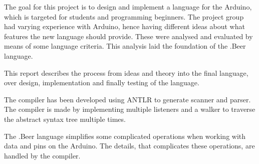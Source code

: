 The goal for this project is to design and implement a language for the Arduino, which is targeted for students and programming beginners. %
The project group had varying experience with Arduino, hence having different ideas about what features the new language should provide. These were analysed and evaluated by means of some language criteria. This analysis laid the foundation of the .Beer language.%

This report describes the process from ideas and theory into the final language, over design, implementation and finally testing of the language.

The compiler has been developed using ANTLR to generate scanner and parser. The compiler is made by implementing multiple listeners and a walker to traverse the abstract syntax tree multiple times.

The .Beer language simplifies some complicated operations when working with data and pins on the Arduino. The details, that complicates these operations, are handled by the compiler. 
